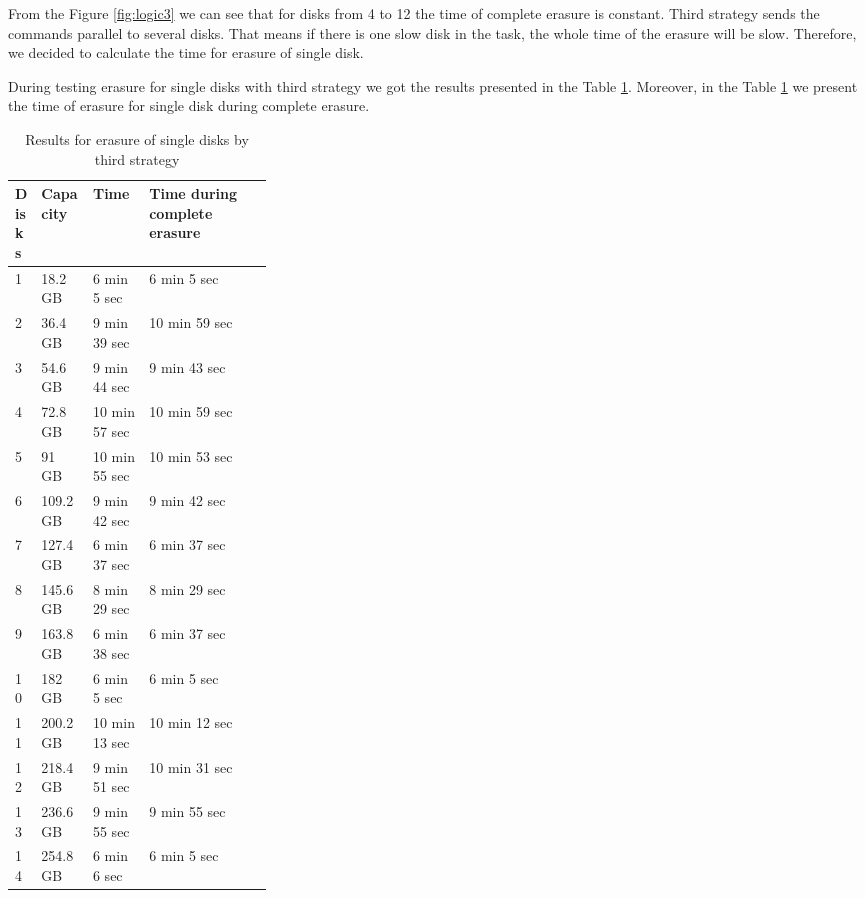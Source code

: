 From the Figure \ref{fig:logic3} we can see that for disks from 4 to 12 the time of complete erasure is constant. Third strategy sends the commands parallel to several disks. That means if there is one slow disk in the task, the whole time of the erasure will be slow. Therefore, we decided to calculate the time for erasure of single disk.

\newpage
During testing erasure for single disks with third strategy we got the results presented in the Table \ref{tbl:tbl_logic3_2}. Moreover, in the Table \ref{tbl:tbl_logic3_2} we present the time of erasure for single disk during complete erasure. 

\begin{table}[h!]
  \caption{Results for erasure of single disks by third strategy}
  \begin{center}
  \begin{tabularx}{\textwidth}{|p{0.1\linewidth}|p{0.2\linewidth}|X|X|X}
    \hline
    Disks & Capacity & Time & Time during complete erasure 
    \\ \hline
    1  & 18.2 GB  & 6 min 5 sec   & 6 min 5 sec    \\ \hline    
    2  & 36.4 GB  & 9 min 39 sec  & 10 min 59 sec  \\ \hline
    3  & 54.6 GB  & 9 min 44 sec  & 9 min 43 sec   \\ \hline
    4  & 72.8 GB  & 10 min 57 sec & 10 min 59 sec  \\ \hline
    5  & 91 GB    & 10 min 55 sec & 10 min 53 sec  \\ \hline
    6  & 109.2 GB & 9 min 42 sec  & 9 min 42 sec   \\ \hline    
    7  & 127.4 GB & 6 min 37 sec  & 6 min 37 sec   \\ \hline
    8  & 145.6 GB & 8 min 29 sec  & 8 min 29 sec   \\ \hline
    9  & 163.8 GB & 6 min 38 sec  & 6 min 37 sec   \\ \hline
    10 & 182 GB   & 6 min 5 sec   & 6 min 5 sec    \\ \hline    
    11 & 200.2 GB & 10 min 13 sec & 10 min 12 sec  \\ \hline    
    12 & 218.4 GB & 9 min 51 sec  & 10 min 31 sec  \\ \hline
    13 & 236.6 GB & 9 min 55 sec  & 9 min 55 sec   \\ \hline
    14 & 254.8 GB & 6 min 6 sec   & 6 min 5 sec    \\ \hline
  \end{tabularx}
  \label{tbl:tbl_logic3_2}
  \end{center}
\end{table}

